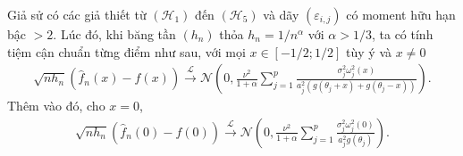 {\dl \label{dl6.2}Giả sử có các giả thiết từ $\left(\mathcal{H}_{1}\right)$ đến $\left(\mathcal{H}_{5}\right)$ và dãy $\left(\varepsilon_{i, j}\right)$ có moment hữu hạn bậc $>2$. Lúc đó, khi băng tần $\left(h_{n}\right)$ thỏa $h_{n}=1 / n^{\alpha}$ với $\alpha>1 / 3$, ta có tính tiệm cận chuẩn từng điểm như sau, với mọi $x \in[-1 / 2 ; 1 / 2]$ tùy ý và $x \neq 0$
\begin{align}
    \sqrt{n h_{n}}\left(\widehat{f}_{n}(x)-f(x)\right) \stackrel{\mathcal{L}}{\longrightarrow} \mathcal{N}\left(0, \frac{\nu^{2}}{1+\alpha} \sum_{j=1}^{p} \frac{\sigma_{j}^{2} \omega_{j}^{2}(x)}{a_{j}^{2}\left(g\left(\theta_{j}+x\right)+g\left(\theta_{j}-x\right)\right)}\right).
    \label{6.6}
\end{align}
Thêm vào đó, cho $x=0$,
\begin{align}
    \sqrt{n h_{n}}\left(\widehat{f}_{n}(0)-f(0)\right) \stackrel{\mathcal{L}}{\longrightarrow} \mathcal{N}\left(0, \frac{\nu^{2}}{1+\alpha} \sum_{j=1}^{p} \frac{\sigma_{j}^{2} \omega_{j}^{2}(0)}{a_{j}^{2} g\left(\theta_{j}\right)}\right).
    \label{6.7}
\end{align}
}

